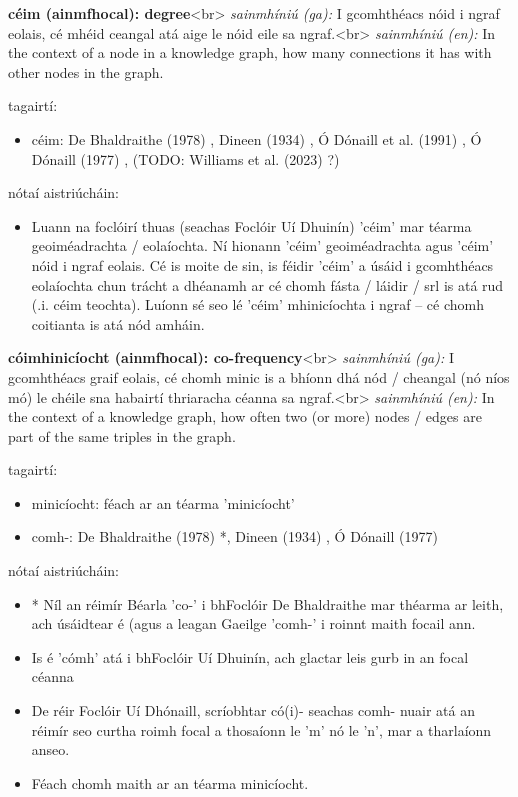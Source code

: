 \documentclass{article}
\begin{document}
\textbf{céim (ainmfhocal): degree}<br>
\textit{sainmhíniú (ga):} I gcomhthéacs nóid i ngraf eolais, cé mhéid ceangal atá aige le nóid eile sa ngraf.<br>
\textit{sainmhíniú (en):} In the context of a node in a knowledge graph, how many connections it has with other nodes in the graph.

tagairtí:
\begin{itemize}
	\item céim: De Bhaldraithe (1978) \cite{de-bhaldraithe}, Dineen (1934) \cite{dineen}, Ó Dónaill et al. (1991) \cite{focloir-beag}, Ó Dónaill (1977) \cite{odonaill}, (TODO: Williams et al. (2023) \cite{storchiste}?)
\end{itemize}

nótaí aistriúcháin:
\begin{itemize}
	\item Luann na foclóirí thuas (seachas Foclóir Uí Dhuinín) 'céim' mar téarma geoiméadrachta / eolaíochta. Ní hionann 'céim' geoiméadrachta agus 'céim' nóid i ngraf eolais. Cé is moite de sin, is féidir 'céim' a úsáid i gcomhthéacs eolaíochta chun trácht a dhéanamh ar cé chomh fásta / láidir / srl is atá rud (.i. céim teochta). Luíonn sé seo lé 'céim' mhinicíochta i ngraf -- cé chomh coitianta is atá nód amháin.
\end{itemize}


\textbf{cóimhinicíocht (ainmfhocal): co-frequency}<br>
\textit{sainmhíniú (ga):} I gcomhthéacs graif eolais, cé chomh minic is a bhíonn dhá nód / cheangal (nó níos mó) le chéile sna habairtí thriaracha céanna sa ngraf.<br>
\textit{sainmhíniú (en):} In the context of a knowledge graph, how often two (or more) nodes / edges are part of the same triples in the graph.

tagairtí:
\begin{itemize}
	\item minicíocht: féach ar an téarma 'minicíocht'
	\item comh-: De Bhaldraithe (1978) \cite{de-bhaldraithe}*, Dineen (1934) \cite{dineen}, Ó Dónaill (1977) \cite{odonaill}
\end{itemize}

nótaí aistriúcháin:
\begin{itemize}
	\item * Níl an réimír Béarla 'co-' i bhFoclóir De Bhaldraithe mar théarma ar leith, ach úsáidtear é (agus a leagan Gaeilge 'comh-' i roinnt maith focail ann.
	\item Is é 'cómh' atá i bhFoclóir Uí Dhuinín, ach glactar leis gurb in an focal céanna
	\item De réir Foclóir Uí Dhónaill, scríobhtar có(i)- seachas comh- nuair atá an réimír seo curtha roimh focal a thosaíonn le 'm' nó le 'n', mar a tharlaíonn anseo.
	\item Féach chomh maith ar an téarma minicíocht.
\end{itemize}
\end{document}
